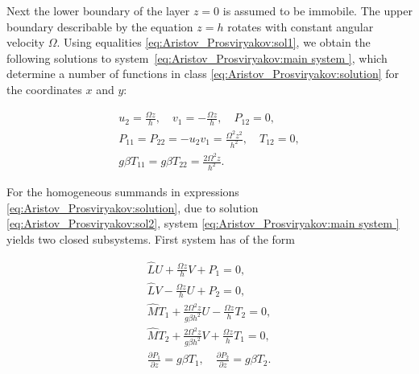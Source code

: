 Next the lower boundary of the layer  $z=0$ is assumed to be immobile. The upper boundary describable by the equation $z=h$  rotates with constant angular velocity  $\Omega$. Using equalities \eqref{eq:Aristov_Prosviryakov:sol1}, we obtain the following solutions to system~\eqref{eq:Aristov_Prosviryakov:main system }, which determine a number of functions in class \eqref{eq:Aristov_Prosviryakov:solution} for the coordinates  $x$ and  $y$:

\begin{gather}

u_2=\frac{\Omega z}{h}, 

\quad 

v_1=-\frac{\Omega z}{h},

\quad 

P_{12}=0, 

\\

\label{eq:Aristov_Prosviryakov:sol2}

 P_{11}=P_{22}=-u_2v_1=\frac{\Omega^2 z^2}{h^2},

\quad 

T_{12}=0, 

\\ g\beta T_{11}=g\beta T_{22}=\frac{2\Omega^2 z}{h^2}.

\end{gather}



For the homogeneous summands in expressions \eqref{eq:Aristov_Prosviryakov:solution}, due to solution \eqref{eq:Aristov_Prosviryakov:sol2}, system \eqref{eq:Aristov_Prosviryakov:main system } yields two closed subsystems. First system has of the form

\begin{gather}

\hat{L}U+\frac{\Omega z}{h}V+P_1=0, 

\\

\hat{L}V-\frac{\Omega z}{h}U+P_{2}=0,

\\

\label{eq:Aristov_Prosviryakov:sys1}

\hat{M}T_1+\frac{2\Omega^2 z}{g\beta h^2}U-\frac{\Omega z}{h}T_2=0, 

\\ \hat{M}T_2+\frac{2\Omega^2 z}{g\beta h^2}V+\frac{\Omega z}{h}T_1=0, 

\\

\frac{\partial P_1}{\partial z}=g\beta T_1, 

\quad  

\frac{\partial P_2}{\partial z}=g\beta T_2.

\end{gather}



